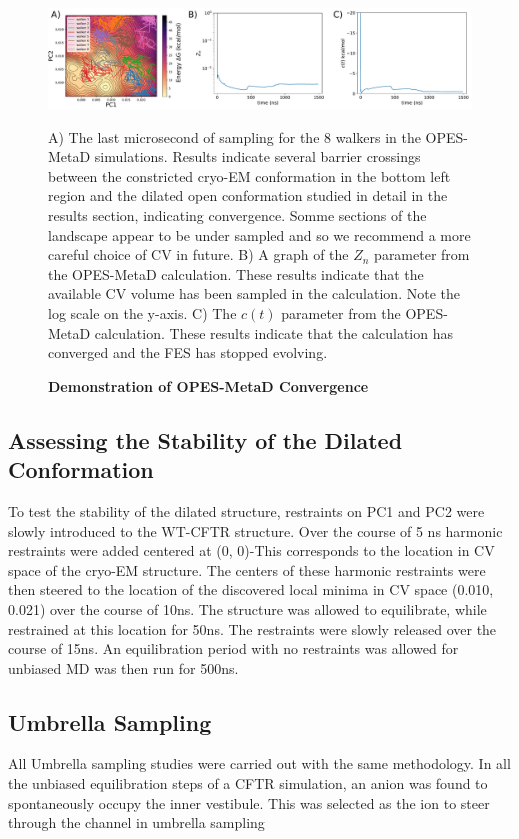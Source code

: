 \begin{figure}
	\begin{center}
		\includegraphics[width=1\textwidth]{figures/opening/FES_mw_trace.pdf}
	\end{center}
	\captionsetup{singlelinecheck = false, justification=raggedright}
	\caption[Demonstration of OPES-MetaD Convergence ] {\textbf{Demonstration of OPES-MetaD Convergence}}{A) The last microsecond of sampling for the 8 walkers in the OPES-MetaD simulations. Results indicate several barrier crossings between the constricted cryo-EM conformation in the bottom left region and the dilated open conformation studied in detail in the results section, indicating convergence. Somme sections of the landscape appear to be under sampled and so we recommend a more careful choice of CV in future. B) A graph of the $Z_n$ parameter from the OPES-MetaD calculation. These results indicate that the available CV volume has been sampled in the calculation. Note the log scale on the y-axis. C) The $c(t)$ parameter from the OPES-MetaD calculation. These results indicate that the calculation has converged and the FES has stopped evolving. }
	\label{convergence_3}
\end{figure}

\subsection{Assessing the Stability of the Dilated Conformation}
To test the stability of the dilated structure, restraints on PC1 and PC2 were slowly introduced to the WT-CFTR structure. Over the course of 5 ns harmonic restraints were added centered at (0, 0)-This corresponds to the location in CV space of the cryo-EM structure. The centers of these harmonic restraints were then steered to the location of the discovered local minima in CV space (0.010, 0.021) over the course of 10ns. The structure was allowed to equilibrate, while restrained at this location for 50ns. The restraints were slowly released over the course of 15ns. An equilibration period with no restraints was allowed for  unbiased MD was then run for 500ns.

\subsection{Umbrella Sampling}
All Umbrella sampling studies were carried out with the same methodology. In all the unbiased equilibration steps of a CFTR simulation, an anion was found to spontaneously occupy the inner vestibule. This was selected as the ion to steer through the channel in umbrella sampling

